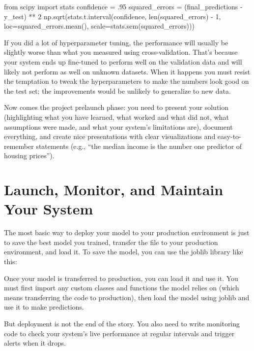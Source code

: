 \begin{pyc}
from scipy import stats
confidence = .95
squared_errors = (final_predictions - y_test) ** 2
np.sqrt(stats.t.interval(confidence, len(squared_errors) - 1,
                         loc=squared_errors.mean(),
                         scale=stats.sem(squared_errors)))
\end{pyc}

If you did a lot of hyperparameter tuning, the performance will usually be slightly worse than what you measured using cross-validation. That's because your system ends up fine-tuned to perform well on the validation data and will likely not perform as well on unknown datasets. When it happens you must resist the temptation to tweak the hyperparameters to make the numbers look good on the test
set; the improvements would be unlikely to generalize to new data.

Now comes the project prelaunch phase: you need to present your solution (highlighting what you have learned, what worked and what did not, what assumptions were made, and what your system's limitations are), document everything, and create nice presentations with clear visualizations and easy-to-remember statements (e.g., ``the median income is the number one predictor of housing prices”).
\section{Launch, Monitor, and Maintain Your System}
The most basic way to deploy your model to your production environment is just to save the best model you trained, transfer the file to your production environment, and load it. To save the model, you can use the joblib library like this:


Once your model is transferred to production, you can load it and use it. You must first import any custom classes and functions the model relies on (which means transferring the code to production), then load the model using joblib and use it to make predictions.

But deployment is not the end of the story. You also need to write monitoring code to check your system's live performance at regular intervals and trigger alerts when it drops. 

